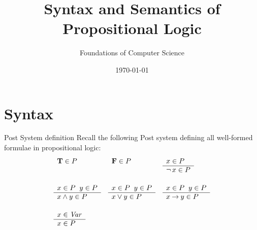 \documentclass[style=sailor,size=12pt]{powerdot}
\title{Syntax and Semantics of\\ Propositional Logic}
\author{Foundations of Computer Science}
\date{\today}
\begin{document}
\maketitle
\section[slide=true]{Syntax}

\begin{wideslide}[bm=,toc=]{Post System definition}
Recall the following Post system defining all well-formed formulae in
propositional logic:
\begin{displaymath}
\begin{array}{lll}
        \begin{array}[t]{l}
        \mbox{\bf T}\in P
        \end{array}
&
        \begin{array}[t]{l}
        \mbox{\bf F}\in P
        \end{array}
&
	\begin{array}[t]{l}
        x \in P \\
        \hline
        \mathop{\neg} x \in P
        \end{array} \\[6ex]

	\begin{array}[t]{l}
	x \in P \;\;y \in P \\
	\hline
	x \land y \in P
	\end{array}
&
	\begin{array}[t]{l}
	x \in P \;\;y \in P \\
	\hline
	x \lor y \in P
	\end{array}
&
	\begin{array}[t]{l}
	x \in P \;\;y \in P \\
	\hline
	x \mathbin{\rightarrow} y \in P
	\end{array} \\[6ex]

	\begin{array}[t]{l}
        x \in \mbox{\it Var\/} \\
        \hline
        x \in P
        \end{array}
\end{array}
\end{displaymath}

\end{wideslide}
\end{document}
